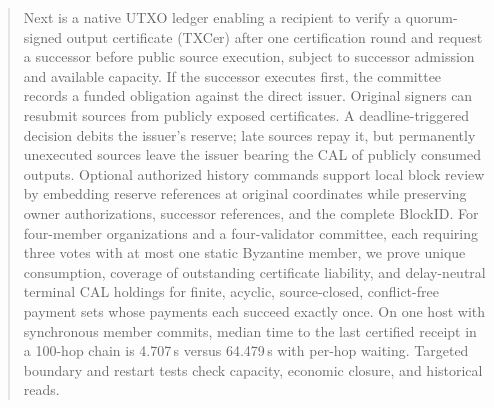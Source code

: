 \begin{abstract}
Next is a native UTXO ledger enabling a recipient to verify a
quorum-signed output certificate (TXCer) after one certification round
and request a successor before public source execution, subject to
successor admission and available capacity. If the successor executes
first, the committee records a funded obligation against the direct
issuer. Original signers can resubmit sources from publicly exposed
certificates. A deadline-triggered decision debits the issuer's reserve;
late sources repay it, but permanently unexecuted sources leave the
issuer bearing the CAL of publicly consumed outputs. Optional authorized
history commands support local block review by embedding reserve
references at original coordinates while preserving owner authorizations,
successor references, and the complete BlockID. For four-member
organizations and a four-validator committee, each requiring three votes
with at most one static Byzantine member, we prove unique consumption,
coverage of outstanding certificate liability, and delay-neutral terminal
CAL holdings for finite, acyclic, source-closed, conflict-free payment
sets whose payments each succeed exactly once. On one host with
synchronous member commits, median time to the last certified receipt
in a 100-hop chain is 4.707\,s versus 64.479\,s with per-hop waiting.
Targeted boundary and restart tests check capacity, economic closure,
and historical reads.
\end{abstract}